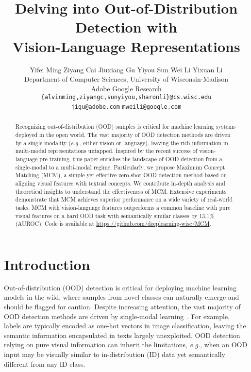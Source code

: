 \documentclass{article}
\title{Delving into Out-of-Distribution Detection with\\ Vision-Language Representations}
\author{Yifei Ming Ziyang Cai Jiuxiang Gu  Yiyou Sun Wei Li Yixuan Li  \\
  Department of Computer Sciences, University of Wisconsin-Madison\\ Adobe Google Research\\
  \texttt{\{alvinming,ziyangc,sunyiyou,sharonli\}@cs.wisc.edu}\\
  \texttt{jigu@adobe.com}  \texttt{mweili@google.com} 
}
\begin{document}
\maketitle

\begin{abstract}
Recognizing out-of-distribution (OOD) samples is critical for machine learning systems deployed in the open world. The vast majority of OOD detection methods are driven by a single modality (\textit{e.g.}, either vision or language), leaving the rich information in multi-modal representations untapped.
Inspired by the recent success of vision-language pre-training, this paper enriches the landscape of OOD detection from a single-modal to a multi-modal regime. Particularly, we propose Maximum Concept Matching (MCM), a simple yet effective zero-shot OOD detection method based on aligning visual features with textual concepts.  We contribute in-depth analysis and theoretical insights to understand the effectiveness of MCM.
Extensive experiments demonstrate that MCM achieves superior performance on a wide variety of real-world tasks. MCM with vision-language features outperforms a common baseline with pure visual features on a hard OOD task with semantically similar classes by 13.1\% (AUROC). Code is available at \url{https://github.com/deeplearning-wisc/MCM}. 
\end{abstract}


\section{Introduction}

Out-of-distribution (OOD) detection is critical for deploying machine learning models in the wild, where samples from novel classes can naturally emerge and should be flagged for caution. Despite increasing attention, the vast majority of OOD detection methods are driven by single-modal learning~\cite{hendrycks-etal-2020-pretrained,hsu2020generalized,jin2022towards,shen2021enhancing,xu-etal-2021-unsupervised,zhan2021out,zheng2020out,zhou2021contrastive}.
For example, labels are typically encoded as one-hot vectors in image classification, 
leaving the semantic information encapsulated in texts largely unexploited. 
OOD detection relying on pure visual information can inherit the limitations, \emph{e.g.}, when an OOD input may be visually similar to  in-distribution (ID) data yet semantically different from any ID class.  
\end{document}
